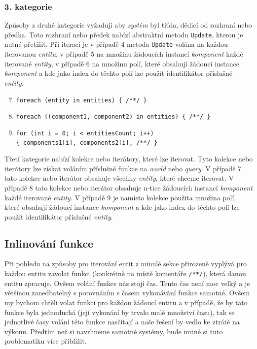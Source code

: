 \subsubsection{3. kategorie}

Způsoby z druhé kategorie vyžadují aby \textit{systém} byl třída, dědicí od rozhraní nebo předka. Toto rozhraní nebo předek nabízí abstraktní metodu \verb|Update|, kterou je nutné přetížit. Při iteraci je v případě 4 metoda \verb|Update| volána na každou iterovanou \textit{entitu}, v případě 5 na množinu žádoucích instancí \textit{komponent} každé iterované \textit{entity}, v případě 6 na množinu polí, které obsahují žádoucí instance \textit{komponent} a kde jako index do těchto polí lze použít identifikátor příslušné \textit{entity}.

\begin{enumerate}
    \setcounter{enumi}{6}
    \item \verb|foreach (entity in entities) { /**/ }|
    \item \verb|foreach ((component1, component2) in entities) { /**/ }|
    \item \verb|for (int i = 0; i < entitiesCount; i++)|\\\verb|{ components1[i], components2[i], /**/ }|
\end{enumerate}

Třetí kategorie nabízí kolekce nebo iterátory, které lze iterovat. Tyto kolekce nebo iterátory lze získat voláním příslušné funkce na \textit{world} nebo \textit{query}. V případě 7 tato kolekce nebo iterátor obsahuje všechny \textit{entity}, které chceme iterovat. V případě 8 tato kolekce nebo iterátor obsahuje n-tice žádoucích instancí \textit{komponent} každé iterované \textit{entity}. V případě 9 je namísto kolekce použita množina polí, které obsahují žádoucí instance \textit{komponent} a kde jako index do těchto polí lze použít identifikátor příslušné \textit{entity}.

\subsection{Inlinování funkce}
Při pohledu na způsoby pro iterování entit z minulé sekce přirozeně vyplývá pro každou entitu zavolat funkci (konkrétně na místě komentáře \verb|/**/|), která danou entitu zpracuje. Ovšem volání funkce nás stojí čas. Tento čas není moc velký a je většinou zanedbatelný s porovnáním s časem vykonávání funkce samotné. Ovšem my bychom chtěli volat funkci pro každou žádoucí entitu a v případě, že by tato funkce byla jednoduchá (její vykonání by trvalo malé množství času), tak se jednotlivé časy volání této funkce nasčítají a naše řešení by vedlo ke ztrátě na výkonu. Předtím než si navrhneme samotné systémy, bude nutné si tuto problematiku více přiblížit.

